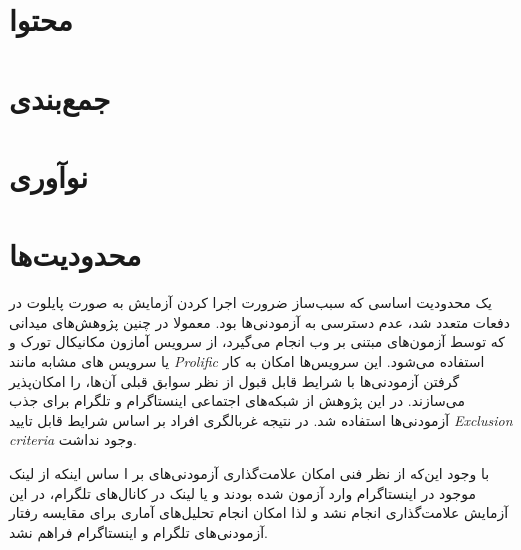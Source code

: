 \section{محتوا}

\section{جمع‌بندی}

\section{نوآوری}


\section{محدودیت‌ها}
یک محدودیت اساسی  که سبب‌ساز ضرورت اجرا کردن آزمایش به صورت
پایلوت در دفعات متعدد شد، عدم دسترسی به آزمودنی‌ها بود. معمولا
در چنین پژوهش‌های میدانی که توسط آزمون‌های مبتنی بر وب
انجام می‌گیرد، از سرویس آمازون مکانیکال تورک و یا سرویس های مشابه مانند
\textit{
    \gls{Prolific}
}
استفاده می‌شود. این سرویس‌ها امکان به کار گرفتن آزمودنی‌ها با شرایط قابل قبول
از نظر سوابق قبلی آن‌ها، را امکان‌پذیر می‌سازند. در این پژوهش از
شبکه‌های اجتماعی  اینستاگرام و تلگرام برای جذب آزمودنی‌ها استفاده شد. در
نتیجه غربالگری افراد بر اساس شرایط قابل تایید
\textit{
    \gls{Exclusion criteria}
}
وجود نداشت.

با وجود این‌که از نظر فنی امکان علامت‌گذاری آزمودنی‌های بر ا ساس اینکه از لینک موجود در اینستاگرام وارد آزمون شده بودند و یا لینک
در کانال‌های تلگرام، در این آزمایش علامت‌گذاری انجام نشد و لذا امکان انجام تحلیل‌های آماری برای مقایسه رفتار آزمودنی‌های تلگرام و اینستاگرام
فراهم نشد.

